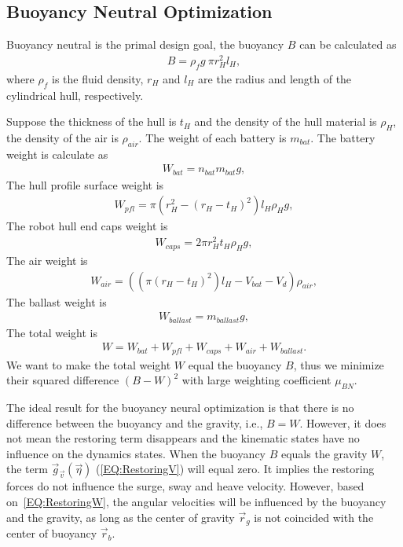 \subsection{Buoyancy Neutral Optimization}
Buoyancy neutral is the primal design goal, the buoyancy $B$ can be calculated as
\begin{align}
B=\rho_{f}g~\pi r_{H}^{2}l_{H},
\end{align}
where $\rho_{f}$ is the fluid density, $r_{H}$ and $l_{H}$ are the radius and length of the cylindrical hull, respectively. 

Suppose the thickness of the hull is $t_{H}$ and the density of the hull material is $\rho_{H}$, the density of the air is $\rho_{air}$. The weight of each battery is $m_{bat}$. The battery weight is calculate as
\begin{align}
W_{bat}=n_{bat}m_{bat}g,
\end{align}
The hull profile surface weight is   
\begin{align}
W_{pfl}=\pi(r_{H}^{2}-(r_{H}-t_{H})^{2})l_{H}\rho_{H}g,
\end{align}
The robot hull end caps weight is 
\begin{align}
W_{caps}=2\pi r_{H}^{2} t_{H} \rho_{H}g,
\end{align}
The air weight is
\begin{align}
W_{air}=((\pi(r_{H}-t_{H})^{2})l_{H}-V_{bat}-V_{d})\rho_{air},
\end{align}
The ballast weight is
\begin{align}
W_{ballast}=m_{ballast}g,
\end{align}
The total weight is
\begin{align}
W=W_{bat}+W_{pfl}+W_{caps}+W_{air}+W_{ballast}.
\end{align}
We want to make the total weight $W$ equal the buoyancy $B$, thus we minimize their squared difference $(B-W)^{2}$ with large weighting coefficient $\mu_{BN}$.

The ideal result for the buoyancy neural optimization is that there is no 
difference between the buoyancy and the gravity, i.e., $B=W$. However, it does not mean the restoring term disappears and the kinematic states have no influence on the dynamics states. When the buoyancy $B$ equals the gravity $W$, the term $\vec{g}_{\vec{v}}(\vec{\eta})$ (\ref{EQ:RestoringV}) will equal zero. It implies the restoring forces do not influence the surge, sway and heave velocity. However, based on~\ref{EQ:RestoringW}, the angular velocities will be influenced by the buoyancy and the gravity, as long as the center of gravity $\vec{r}_{g}$ is not coincided with the center of buoyancy $\vec{r}_{b}$. 
